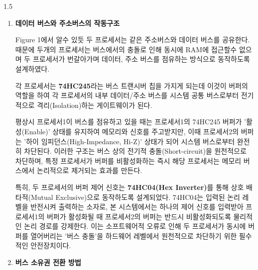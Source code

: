 \documentclass[a4paper, 12pt]{article}
\begin{document}
\begin{spacing}{1.5}
\begin{enumerate}
\begin{itemize}
    \item \textbf{3. 오프셋 주소 적용 (데이터 접근 단계) :}
    프로세서는 주소 버퍼(74HC245)를 통해 하위 7비트(116)를 메모리의 $A_0 \sim A_6$ 핀으로 보낸다.
\end{itemize}

\item  \textbf{데이터 버스와 주소버스의 작동구조}

Figure 1에서 알수 있듯 두 프로세서는 같은 주소버스와 데이터 버스를 공유한다. 때문에 두개의 프로세서는 버스에서의 충돌로 인해 동시에 RAM에 접근할수 없으며 두 프로세서가 번갈아가며 데이터, 주소 버스를 점유하는 방식으로 동작하도록 설계하였다. 

각 프로세서는 \textbf{74HC245}라는 버스 트랜시버 칩을 가지게 되는데 이것이 버퍼의 역할을 하여 각 프로세서의 내부 데이터/주소 버스를 시스템 공통 버스로부터 전기적으로 격리(Isolation)하는 게이트웨이가 된다.

평상시 프로세서1이 버스를 점유하고 있을 때는 프로세서1의 74HC245 버퍼가 '활성(Enable)' 상태를 유지하여 메모리와 신호를 주고받지만, 이때 프로세서2의 버퍼는 '하이 임피던스(High-Impedance, Hi-Z)' 상태가 되어 시스템 버스로부터 완전히 차단된다. 이러한 구조는 버스 상의 전기적 충돌(Short-circuit)을 원천적으로 차단하며, 특정 프로세서가 버퍼를 비활성화하는 즉시 해당 프로세서는 메모리 버스에서 논리적으로 제거되는 효과를 만든다.

특히, 두 프로세서의 버퍼 제어 신호는 \textbf{74HC04(Hex Inverter)}를 통해 상호 배타적(Mutual Exclusive)으로 동작하도록 설계되었다. 74HC04는 입력된 논리 레벨을 반전시켜 출력하는 소자로, 본 시스템에서는 하나의 제어 신호를 입력받아 프로세서1의 버퍼가 활성화될 때 프로세서2의 버퍼는 반드시 비활성화되도록 물리적인 논리 경로를 강제한다. 이는 소프트웨어적 오류로 인해 두 프로세서가 동시에 버퍼를 열어버리는 '버스 충돌'을 하드웨어 레벨에서 원천적으로 차단하기 위한 필수적인 안전장치이다.

\item  \textbf{버스 소유권 전환 방법}


\end{enumerate}
\end{spacing}
\end{document}
